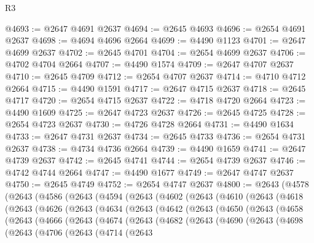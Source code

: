 \begin{lexlean}{R3}
\begin{coremodule}
@4693 := @2647 @4691 @2637
@4694 := @2645 @4693
@4696 := @2654 @4691 @2637
@4698 := @4694 @4696 @2664
@4699 := @4490 @1123
@4701 := @2647 @4699 @2637
@4702 := @2645 @4701
@4704 := @2654 @4699 @2637
@4706 := @4702 @4704 @2664
@4707 := @4490 @1574
@4709 := @2647 @4707 @2637
@4710 := @2645 @4709
@4712 := @2654 @4707 @2637
@4714 := @4710 @4712 @2664
@4715 := @4490 @1591
@4717 := @2647 @4715 @2637
@4718 := @2645 @4717
@4720 := @2654 @4715 @2637
@4722 := @4718 @4720 @2664
@4723 := @4490 @1609
@4725 := @2647 @4723 @2637
@4726 := @2645 @4725
@4728 := @2654 @4723 @2637
@4730 := @4726 @4728 @2664
@4731 := @4490 @1634
@4733 := @2647 @4731 @2637
@4734 := @2645 @4733
@4736 := @2654 @4731 @2637
@4738 := @4734 @4736 @2664
@4739 := @4490 @1659
@4741 := @2647 @4739 @2637
@4742 := @2645 @4741
@4744 := @2654 @4739 @2637
@4746 := @4742 @4744 @2664
@4747 := @4490 @1677
@4749 := @2647 @4747 @2637
@4750 := @2645 @4749
@4752 := @2654 @4747 @2637
@4800 := @2643
    (@4578
      (@2643
        (@4586
          (@2643
            (@4594
              (@2643
                (@4602
                  (@2643
                    (@4610
                      (@2643
                        (@4618
                          (@2643
                            (@4626
                              (@2643
                                (@4634
                                  (@2643
                                    (@4642
                                      (@2643
                                        (@4650
                                          (@2643
                                            (@4658
                                              (@2643
                                                (@4666
                                                  (@2643
                                                    (@4674
                                                      (@2643
                                                        (@4682
                                                          (@2643
                                                            (@4690
                                                              (@2643
                                                                (@4698
                                                                  (@2643
                                                                    (@4706
                                                                      (@2643
                                                                        (@4714
                                                                          (@2643

\end{coremodule}
\end{lexlean}
